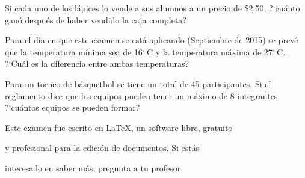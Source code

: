 \documentclass[11pt]{article}
\newcommand{\fecha}{Septiembre de 2015}
\begin{document}
\vspace{4cm}

Si cada uno de los l\'apices lo vende a sus alumnos a un precio de \$2.50,
?`cu\'anto gan\'o despu\'es de haber vendido la caja completa?

\vspace{4cm}

Para el d\'ia en que este examen se est\'a aplicando (\fecha) se
prev\'e que la temperatura m\'inima sea de 16$^{\circ}$\,C y la temperatura
m\'axima de 27$^{\circ}$\,C. ?`Cu\'al es la diferencia entre ambas temperaturas?

\vspace{4cm}

Para un torneo de b\'asquetbol se tiene un total de 45 participantes. Si el
reglamento dice que los equipos pueden tener un m\'aximo de 8 integrantes,
?`cu\'antos equipos se pueden formar?

\vfill

{\footnotesize \hfill Este examen fue escrito en \LaTeX, un software libre, gratuito}

{\footnotesize \hfill y profesional para la edici\'on de documentos. Si est\'as }

{\footnotesize \hfill interesado en saber m\'as, pregunta a tu profesor.}
\end{document}
